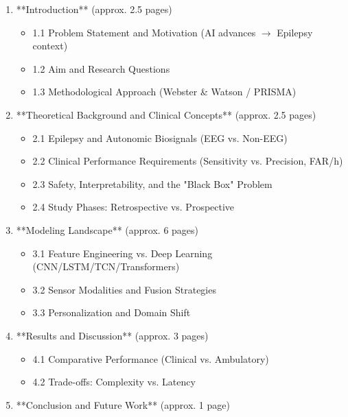 \begin{enumerate}
  \item **Introduction** (approx. 2.5 pages)
    \begin{itemize}
      \item 1.1 Problem Statement and Motivation (AI advances $\rightarrow$ Epilepsy context)
      \item 1.2 Aim and Research Questions
      \item 1.3 Methodological Approach (Webster \& Watson / PRISMA)
    \end{itemize}
    
  \item **Theoretical Background and Clinical Concepts** (approx. 2.5 pages)
    \begin{itemize}
      \item 2.1 Epilepsy and Autonomic Biosignals (EEG vs. Non-EEG)
      \item 2.2 Clinical Performance Requirements (Sensitivity vs. Precision, FAR/h)
      \item 2.3 Safety, Interpretability, and the "Black Box" Problem
      \item 2.4 Study Phases: Retrospective vs. Prospective
    \end{itemize}
    
  \item **Modeling Landscape** (approx. 6 pages)
    \begin{itemize}
      \item 3.1 Feature Engineering vs. Deep Learning (CNN/LSTM/TCN/Transformers)
      \item 3.2 Sensor Modalities and Fusion Strategies
      \item 3.3 Personalization and Domain Shift
    \end{itemize}
    
  \item **Results and Discussion** (approx. 3 pages)
    \begin{itemize}
      \item 4.1 Comparative Performance (Clinical vs. Ambulatory)
      \item 4.2 Trade-offs: Complexity vs. Latency
    \end{itemize}
    
  \item **Conclusion and Future Work** (approx. 1 page)
\end{enumerate}